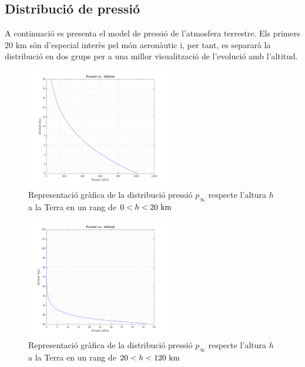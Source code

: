 \subsection{Distribució de pressió}
A continuació es presenta el model de pressió de l'atmosfera terrestre.\newline
Els primers 20 km són d'especial interès pel món aeronàutic i, per tant, es separarà la distribució en dos grups per a una millor visualització de l'evolució amb l'altitud.
\begin{figure}[ht]
    \centering
    \includegraphics[width=0.56\textwidth]{imagenes/03_grafiques_general/pressure_0_20_km_earth.pdf}
    \caption{Representació gràfica de la distribució pressió $p_\infty$ respecte l'altura $h$ a la Terra en un rang de $0 < h < 20 \ \kilo\meter$}
    \label{fig:pressure_0_20_km_earth}
\end{figure}

\begin{figure}[ht]
    \centering
    \includegraphics[width=0.56\textwidth]{imagenes/03_grafiques_general/pressure_20_120_km_earth.pdf}
    \caption{Representació gràfica de la distribució pressió $p_\infty$ respecte l'altura $h$ a la Terra en un rang de $20 < h < 120 \ \kilo\meter$}
    \label{fig:pressure_20_120_km_earth}
\end{figure}

